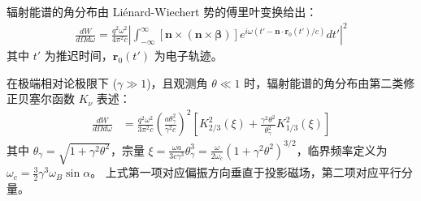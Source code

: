 辐射能谱的角分布由 Liénard-Wiechert 势的傅里叶变换给出：
\begin{align}
    \frac{dW}{d\Omega d\omega} = \frac{q^2 \omega^2}{4\pi^2 c} \left| \int_{-\infty}^{\infty} [\mathbf{n} \times (\mathbf{n} \times \boldsymbol{\beta})] e^{i\omega(t' - \mathbf{n}\cdot\mathbf{r}_0(t')/c)} dt' \right|^2 \label{eq:fundamental_rad}
\end{align}
其中 $t'$ 为推迟时间，$\mathbf{r}_0(t')$ 为电子轨迹。

\begin{theorem}[同步辐射的角分布]
    在极端相对论极限下 ($\gamma \gg 1$)，且观测角 $\theta \ll 1$ 时，辐射能谱的角分布由第二类修正贝塞尔函数 $K_\nu$ 表述：
    \begin{align}
        \frac{dW}{d\Omega d\omega} &= \frac{q^2 \omega^2}{3\pi^2 c} \left( \frac{a \theta_\gamma^2}{\gamma^2 c} \right)^2 \left[ K_{2/3}^2(\xi) + \frac{\gamma^2 \theta^2}{\theta_\gamma^2} K_{1/3}^2(\xi) \right] \label{eq:angular_dist}
    \end{align}
    其中 $\theta_\gamma = \sqrt{1 + \gamma^2 \theta^2}$，宗量 $\xi = \frac{\omega a}{3c\gamma^3} \theta_\gamma^3 = \frac{\omega}{2\omega_c} (1+\gamma^2\theta^2)^{3/2}$，临界频率定义为 $\omega_c = \frac{3}{2}\gamma^3 \omega_B \sin\alpha$。
    上式第一项对应偏振方向垂直于投影磁场，第二项对应平行分量。
\end{theorem}

